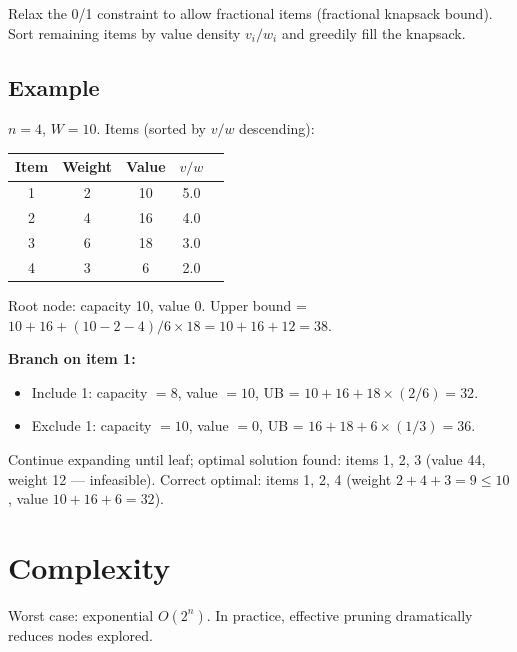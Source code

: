 \documentclass[12pt]{article}
\begin{document}
Relax the 0/1 constraint to allow fractional items (fractional knapsack bound).
Sort remaining items by value density $v_i/w_i$ and greedily fill the knapsack.

\subsection*{Example}

$n=4$, $W=10$. Items (sorted by $v/w$ descending):

\begin{center}
\begin{tabular}{ccccc}
\toprule
Item & Weight & Value & $v/w$ \\
\midrule
1 & 2 & 10 & 5.0 \\
2 & 4 & 16 & 4.0 \\
3 & 6 & 18 & 3.0 \\
4 & 3 & 6  & 2.0 \\
\bottomrule
\end{tabular}
\end{center}

Root node: capacity 10, value 0.
Upper bound = $10 + 16 + (10-2-4)/6 \times 18 = 10+16+12 = 38$.

\textbf{Branch on item 1:}
\begin{itemize}
  \item Include 1: capacity $= 8$, value $= 10$, UB = $10 + 16 + 18 \times (2/6) = 32$.
  \item Exclude 1: capacity $= 10$, value $= 0$, UB = $16 + 18 + 6 \times (1/3) = 36$.
\end{itemize}

Continue expanding until leaf; optimal solution found: items 1, 2, 3 (value 44, weight 12 — infeasible).
Correct optimal: items 1, 2, 4 (weight $2+4+3=9 \leq 10$, value $10+16+6=32$).

\section{Complexity}

Worst case: exponential $O(2^n)$. In practice, effective pruning dramatically reduces nodes explored.
\end{document}

